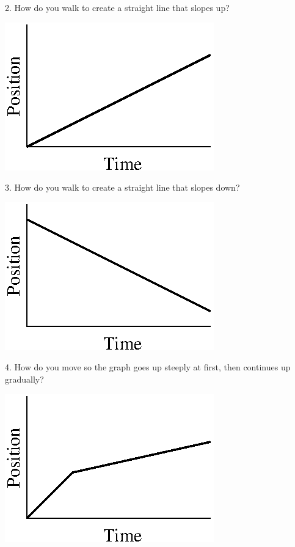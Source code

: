 2. How do you walk to create a straight line that slopes up?

\vspace{0.3cm}
{\par\raggedright \includegraphics{position/position_fig6.eps} \par}
\vspace{0.3cm}

3. How do you walk to create a straight line that slopes down?

\vspace{0.3cm}
{\par\raggedright \includegraphics{position/position_fig7.eps} \par}
\vspace{0.3cm}

4. How do you move so the graph goes up steeply at first, then continues up
gradually?

\vspace{0.3cm}
{\par\raggedright \includegraphics{position/position_fig8.eps} \par}
\vspace{0.3cm}

